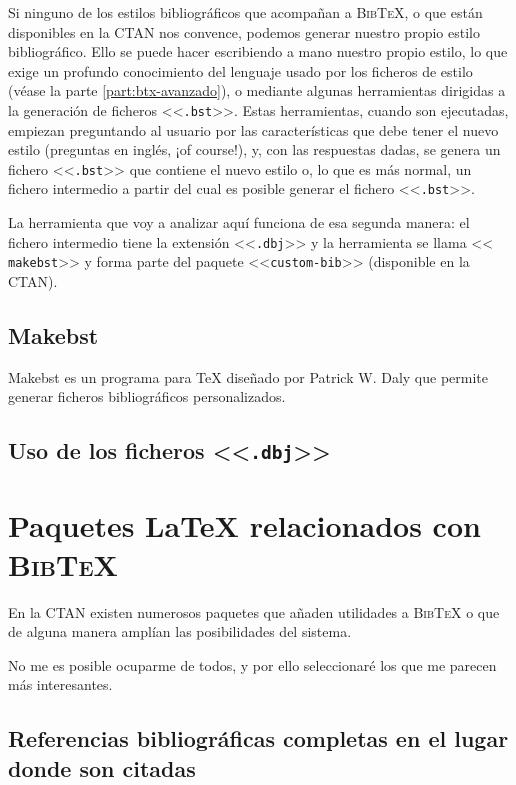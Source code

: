 \documentclass[a4paper,11pt]{article}
\def\btx-{\textsc{Bib\TeX}}
\def\ltx-{\LaTeX}
\def\ltr#1-{<<\texttt{#1}>>}
\def\tpf#1-{\ltr.#1-}
\begin{document}
Si ninguno  de los estilos bibliográficos  que acompañan a \btx-,  o que están
disponibles en  la CTAN  nos convence, podemos  generar nuestro  propio estilo
bibliográfico. Ello se  puede hacer escribiendo a mano  nuestro propio estilo,
lo que exige  un profundo conocimiento del lenguaje usado  por los ficheros de
estilo   (véase  la   parte  \ref{part:btx-avanzado}),   o   mediante  algunas
herramientas  dirigidas  a  la   generación  de  ficheros  \tpf  bst-.   Estas
herramientas, cuando  son ejecutadas, empiezan preguntando al  usuario por las
características  que debe  tener el  nuevo  estilo (preguntas  en inglés,  ¡of
course!), y,  con las  respuestas dadas,  se genera un  fichero \tpf  bst- que
contiene el  nuevo estilo  o, lo que  es más  normal, un fichero  intermedio a
partir del cual es posible generar el fichero \tpf bst-.

La herramienta  que voy  a analizar  aquí funciona de  esa segunda  manera: el
fichero intermedio tiene la extensión \tpf dbj- y la herramienta se llama \ltr
makebst- y  forma parte del paquete <<\texttt{custom-bib}>>  (disponible en la
CTAN).

\subsection{Makebst}
\label{sec:makebst}

Makebst es un  programa para \TeX{} diseñado por Patrick  W.  Daly que permite
generar ficheros bibliográficos personalizados.


\subsection{Uso de los ficheros \tpf dbj-}
\label{sec:uso-de-los}


\section{Paquetes \ltx- relacionados con \btx-}
\label{sec:paqu-ltx-relac}

En la CTAN  existen numerosos paquetes que añaden utilidades a  \btx- o que de
alguna manera amplían las posibilidades del sistema.

No me es posible ocuparme de todos, y por ello seleccionaré los que me parecen
más interesantes.

\subsection{Referencias  bibliográficas  completas   en  el  lugar  donde  son citadas}
\label{sec:refer-bibl-compl}
\end{document}
